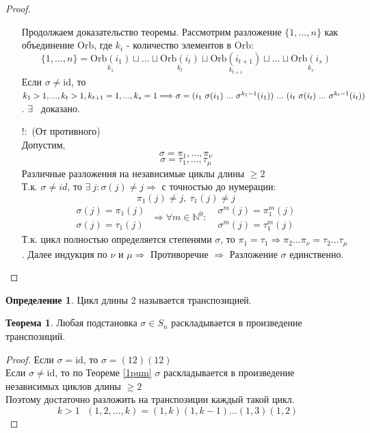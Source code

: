 \documentclass[a4paper, 12pt]{article}
\newcommand{\N}{\mathbb N}
\theoremstyle{definition}
\newtheorem*{definition}{Определение}
\newtheorem*{theorem}{Теорема}
\begin{document}
\begin{proof}
\begin{itemize}
    Продолжаем доказательство теоремы. Рассмотрим разложение $\{1,...,n\}$ как объединение $\textrm{Orb}$, где $k_i$ - количество элементов в $\textrm{Orb}$:
    $$\{1,...,n\} = \underset{k_1}{\textrm{Orb}(i_1)} \sqcup ... \sqcup \underset{k_t}{\textrm{Orb}(i_t)}\sqcup \underset{k_{t+1}}{\textrm{Orb}(i_{t+1})} \sqcup ... \sqcup \underset{k_s}{\textrm{Orb}(i_s)}$$ 
    Если $\sigma \neq \textrm{id}$, то $k_1>1,...,k_t>1,k_{t+1}=1,...,k_s=1 \Longrightarrow \\
    \sigma = (i_1 \ \sigma(i_1) \ ... \ \sigma^{k_1-1}(i_1)) \ ... \ (i_t \ \sigma(i_t) \ ... \ \sigma^{k_t-1}(i_t))$. $\exists$ \ доказано.   
    \item[ $!:$ ](От противного)\\
    Допустим, $$\sigma = \pi_1,...,\pi_{\nu}$$ $$\sigma = \tau_1,...,\tau_{\mu}$$  Различные разложения на независимые циклы длины $\geq 2$ \\
    Т.к. $\sigma \neq id$, то $\exists \ j: \sigma(j) \neq j \Longrightarrow $ с точностью до нумерации: \
    $$\pi_1(j) \neq j, \ \tau_1(j) \neq j$$  
    $$\begin{matrix}
      \sigma(j) = \pi_1(j) \\
      \sigma(j) = \tau_1(j)
    \end{matrix} \ \Longrightarrow \forall m \in \N^0: \  \ \ \begin{matrix}
      \sigma^m(j) = \pi_1^m(j) \\
      \sigma^m(j) = \tau_1^m(j)
    \end{matrix}$$ 
    Т.к. цикл полностью определяется степенями $\sigma$, то $\pi_1 = \tau_1 \Longrightarrow \pi_2 ... \pi_{\nu} = \tau_2 ... \tau_{\mu}$. Далее индукция по $\nu$ и $\mu \Longrightarrow $ Противоречие $\Longrightarrow $ Разложение $\sigma$ единственно.   
    \end{itemize}
  \end{proof} 
  \begin{definition}
    Цикл длины 2 называется транспозицией. 
  \end{definition}
  \begin{theorem}
    Любая подстановка $\sigma \in S_n$ раскладывается в произведение транспозиций. 
  \end{theorem} 
  \begin{proof}
    Если $\sigma = \textrm{id}$, то $\sigma = (12)(12)$ \\
    Если $\sigma \neq \textrm{id}$, то по Теореме \eqref{1pum} $\sigma$ раскладывается в произведение независимых циклов длины $\geq 2$ \\
    Поэтому достаточно разложить на транспозиции каждый такой цикл.
    $$k>1 \ \ \ (1,2,...,k) = (1,k)(1,k-1)...(1,3)(1,2)$$     
  \end{proof} 
\end{document}
